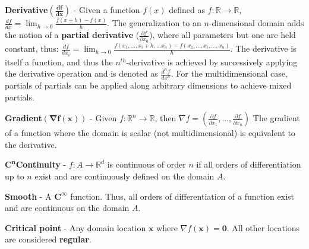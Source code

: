 \begin{defn}
\textbf{Derivative}$\mathbf{(\frac{df}{dx})}$ - Given a function $f(x)$ defined
 as $f : \mathbb{R} \rightarrow \mathbb{R}$, \\
 $\frac{df}{dx} = \lim_{h\rightarrow 0}\frac{f(x+h)-f(x)}{h}$.
 The generalization to an $n$-dimensional domain adds the notion of a \textbf{partial derivative} ($\frac{\partial f}{\partial x_0}$), where all parameters but one are held constant, thus: $\frac{df}{dx_i} = \lim_{h\rightarrow 0}\frac{f(x_1,...,x_i+h,...x_n)-f(x_1,...,x_i,...,x_n)}{h}$.
 The derivative is itself a function, and thus the $n^{th}$-derivative is achieved by successively applying the derivative operation and is denoted as $\frac{d^nf}{dx^n}$.
 For the multidimensional case, partials of partials can be applied along arbitrary dimensions to achieve mixed partials.
\end{defn}

\begin{defn}
  \textbf{Gradient}$\mathbf{(\nabla f(\mathbf{x}))}$ - Given $f : \mathbb{R}^n \rightarrow \mathbb{R}$, then $\nabla f = \left(\frac{\partial f}{\partial
  x_1},...,\frac{\partial f}{\partial x_{n}}\right)$
  The gradient of a function where the domain is scalar (not multidimensional) is equivalent to the derivative.
\end{defn}

\begin{defn}
  $\mathbf{C^n}$\textbf{Continuity} - $f : A \rightarrow \mathbb{R}^d$ is
  continuous of order $n$ if all orders of differentiation up to $n$ exist and
  are continuously defined on the domain $A$.
\end{defn}

\begin{defn}
  \textbf{Smooth} - A $\mathbf{C^\infty}$ function. Thus, all orders of
  differentiation of a function exist and are continuous on the domain $A$.
\end{defn}

\begin{defn}
  \textbf{Critical point} - Any domain location $\mathbf{x}$ where $\nabla
  f(\mathbf{x}) = \mathbf{0}$. All other locations are considered
  \textbf{regular}.
\end{defn}

